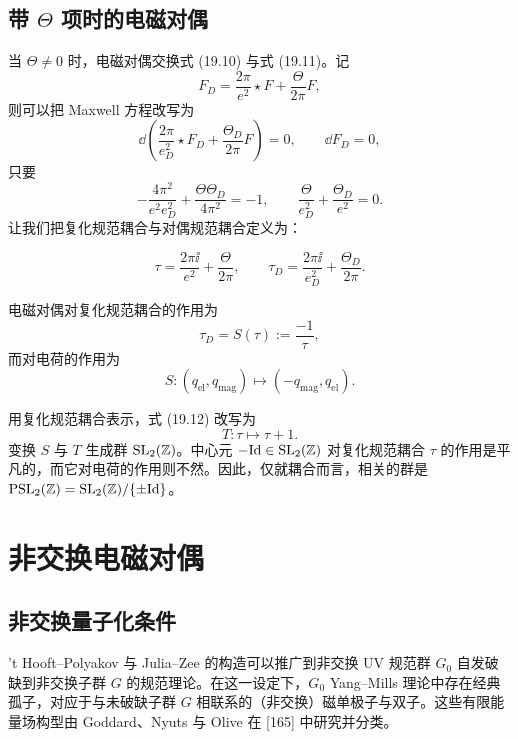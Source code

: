 \subsection{带 $\Theta$ 项时的电磁对偶}

当 $\Theta\ne 0$ 时，电磁对偶交换式 (19.10) 与式 (19.11)。记
\begin{equation}
F_D=\frac{2\pi}{e^2}\star F+\frac{\Theta}{2\pi}F, \tag{19.13}
\end{equation}
则可以把 Maxwell 方程改写为
\[
\dd\left(\frac{2\pi}{e_D^2}\star F_D+\frac{\Theta_D}{2\pi}F\right)=0,
\qquad \dd F_D=0,
\]
只要
\begin{equation}
-\frac{4\pi^2}{e^2e_D^2}+\frac{\Theta\Theta_D}{4\pi^2}=-1,
\qquad
\frac{\Theta}{e_D^2}+\frac{\Theta_D}{e^2}=0. \tag{19.14}
\end{equation}
让我们把复化规范耦合与对偶规范耦合定义为：


\[
\tau=\frac{2\pi\ii}{e^2}+\frac{\Theta}{2\pi},
\qquad
\tau_D=\frac{2\pi\ii}{e_D^2}+\frac{\Theta_D}{2\pi}.
\]

\begin{proposition}[19.17]
电磁对偶对复化规范耦合的作用为
\[
\tau_D=S(\tau):=\frac{-1}{\tau},
\]
而对电荷的作用为
\[
S\colon (q_{\mathrm{el}},q_{\mathrm{mag}})\longmapsto(-q_{\mathrm{mag}},q_{\mathrm{el}}).
\]
\end{proposition}

用复化规范耦合表示，式 (19.12) 改写为
\[
T\colon \tau\longmapsto \tau+1 .
\]
变换 $S$ 与 $T$ 生成群 $\operatorname{SL}_2(\mathbb{Z})$。中心元 $-\mathrm{Id}\in\operatorname{SL}_2(\mathbb{Z})$ 对复化规范耦合 $\tau$ 的作用是平凡的，而它对电荷的作用则不然。因此，仅就耦合而言，相关的群是 $\operatorname{PSL}_2(\mathbb{Z})=\operatorname{SL}_2(\mathbb{Z})/\{\pm\mathrm{Id}\}$。

\section{非交换电磁对偶}

\subsection{非交换量子化条件}

't Hooft--Polyakov 与 Julia--Zee 的构造可以推广到非交换 UV 规范群 $G_0$ 自发破缺到非交换子群 $G$ 的规范理论。在这一设定下，$G_0$ Yang--Mills 理论中存在经典孤子，对应于与未破缺子群 $G$ 相联系的（非交换）磁单极子与双子。这些有限能量场构型由 Goddard、Nyuts 与 Olive 在 [165] 中研究并分类。

